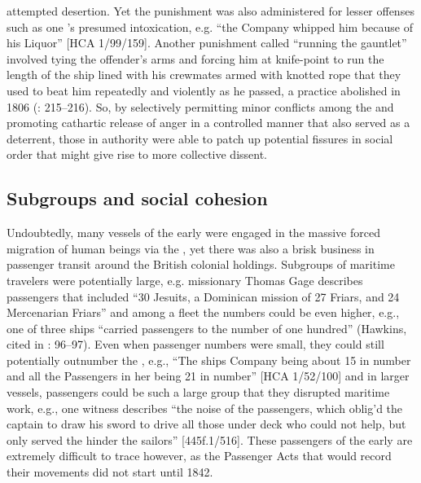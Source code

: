 attempted desertion.  Yet the punishment was also administered for lesser offenses such as one ’s presumed intoxication, e.g. “the Company whipped him because of his Liquor” [HCA 1/99/159]. Another punishment called “running the gauntlet” involved tying the offender’s arms and forcing him at knife-point to run the length of the ship lined with his crewmates armed with knotted rope that they used to beat him repeatedly and violently as he passed, a practice abolished in 1806 (\citealt{AdkinsAdkins2008}: 215--216). So, by selectively permitting minor conflicts among the  and promoting cathartic release of anger in a controlled manner that also served as a deterrent, those in authority were able to patch up potential fissures in social order that might give rise to more collective dissent. 

\subsection{{Subgroups and social cohesion}}\label{sec:4.2.4}

Undoubtedly, many  vessels of the early  were engaged in the massive forced migration of human beings via the , yet there was also a brisk business in passenger transit around the British colonial holdings. Subgroups of maritime travelers were potentially large, e.g. missionary Thomas Gage describes passengers that included “30 Jesuits, a Dominican mission of 27 Friars, and 24 Mercenarian Friars” \citep[15,]{Gage1648} and among a fleet the numbers could be even higher, e.g., one  of three ships “carried passengers to the number of one hundred” (Hawkins, cited in \citealt{Bicheno2012}: 96--97). Even when passenger numbers were small, they could still potentially outnumber the , e.g., “The ships Company being about 15 in number and all the Passengers in her being 21 in number” [HCA 1/52/100] and in larger vessels, passengers could be such a large group that they disrupted maritime work, e.g., one witness describes “the noise of the passengers, which oblig’d the captain to draw his sword to drive all those under deck who could not help, but only served the hinder the sailors” [445f.1/516]. These passengers of the early  are extremely difficult to trace however, as the Passenger Acts that would record their movements did not start until 1842.

